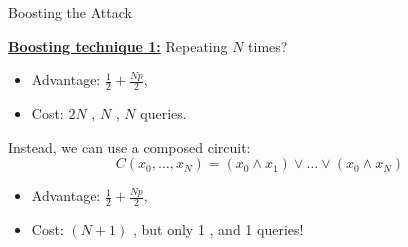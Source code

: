 \documentclass{beamer}
\begin{document}
	\begin{frame}{Boosting the \indcpad Attack}
 
    {\small
    \underline{\bf Boosting technique 1:} Repeating $N$ times?
    \begin{itemize}
        \item Advantage: $\frac{1}{2} + \frac{Np}{2}$,
        \item Cost: $2N$ \enc, $N$ \eval, $N$ \dec queries.
    \end{itemize}\pause\vspace{0.3cm}
    
    Instead, we can use a composed circuit: 
    \[
        C(x_0, \dots, x_{N}) = (x_0 \wedge x_1) \vee \dots \vee (x_0 \wedge x_N)
    \]
    \begin{itemize}
        \item Advantage: $\frac{1}{2} + \frac{Np}{2}$,
        \item Cost: $(N+1)$ \enc, but only 1 \eval, and 1 \dec queries!
    \end{itemize}
    }
	\end{frame}
\end{document}
